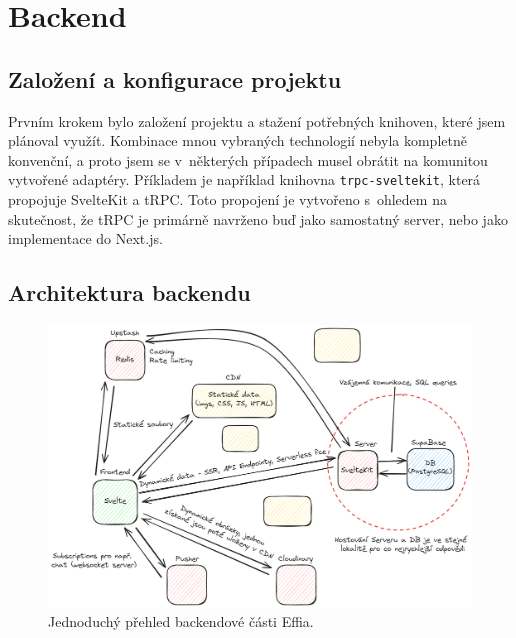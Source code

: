 \documentclass[12pt, a4paper,
openright
]{report}
\let\oldchapter\chapter
\renewcommand{\chapter}{
	\clearpage
	\pagestyle{fancy}
	\oldchapter
}
\begin{document}
\chapter{Backend}

\section{Založení a konfigurace projektu}
Prvním krokem bylo založení projektu a stažení potřebných knihoven, které jsem plánoval využít. Kombinace mnou vybraných technologií nebyla kompletně konvenční, a proto jsem se v~některých případech musel obrátit na komunitou vytvořené adaptéry. Příkladem je například knihovna \texttt{trpc-sveltekit}, která propojuje SvelteKit a tRPC. Toto propojení je vytvořeno s~ohledem na skutečnost, že tRPC je primárně navrženo buď jako samostatný server, nebo jako implementace do Next.js.

\section{Architektura backendu}
\begin{figure}[h!]
	\centering %
	\includegraphics[width=1\linewidth]{image/effio-architecture.png} 
	\caption{Jednoduchý přehled backendové části Effia.} %
	\label{fig:effio-architecture} %
\end{figure}
\end{document}
